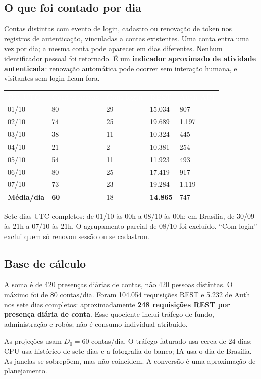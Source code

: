\documentclass[10pt,a4paper]{article}
\newcommand{\smallnote}[1]{\par{\footnotesize\color{NFMuted}#1\par}}
\newcommand{\headcell}[1]{\textcolor{white}{\bfseries #1}}
\begin{document}
\subsection{O que foi contado por dia}
Contas distintas com evento de login, cadastro ou renovação de token nos registros de autenticação, vinculadas a contas existentes. Uma conta entra uma vez por dia; a mesma conta pode aparecer em dias diferentes. Nenhum identificador pessoal foi retornado. É um \textbf{indicador aproximado de atividade autenticada}: renovação automática pode ocorrer sem interação humana, e visitantes sem login ficam fora.

\begingroup\small\renewcommand{\arraystretch}{1.22}
\par\noindent\begin{tabularx}{\linewidth}{@{}Y R{30mm}R{27mm}R{33mm}R{31mm}@{}}
\headcell{Dia UTC}&\headcell{Contas ativas}&\headcell{Com login}&\headcell{REST}&\headcell{Auth API}\\
01/10&80&29&15.034&807\\
02/10&74&25&19.689&1.197\\
03/10&38&11&10.324&445\\
04/10&21&2&10.381&254\\
05/10&54&11&11.923&493\\
06/10&80&25&17.419&917\\
07/10&73&23&19.284&1.119\\
\textbf{Média/dia}&\textbf{60}&18&\textbf{14.865}&747\\
\end{tabularx}\endgroup
\smallnote{Sete dias UTC completos: de 01/10 às 00h a 08/10 às 00h; em Brasília, de 30/09 às 21h a 07/10 às 21h. O agrupamento parcial de 08/10 foi excluído. ``Com login'' exclui quem só renovou sessão ou se cadastrou.}

\subsection{Base de cálculo}
A soma é de 420 presenças diárias de contas, não 420 pessoas distintas. O máximo foi de 80 contas/dia. Foram 104.054 requisições REST e 5.232 de Auth nos sete dias completos: aproximadamente \textbf{248 requisições REST por presença diária de conta}. Esse quociente inclui tráfego de fundo, administração e robôs; não é consumo individual atribuído.

As projeções usam \(D_0=60\) contas/dia. O tráfego faturado usa cerca de 24 dias; CPU usa histórico de sete dias e a fotografia do banco; IA usa o dia de Brasília. As janelas se sobrepõem, mas não coincidem. A conversão é uma aproximação de planejamento.
\end{document}
